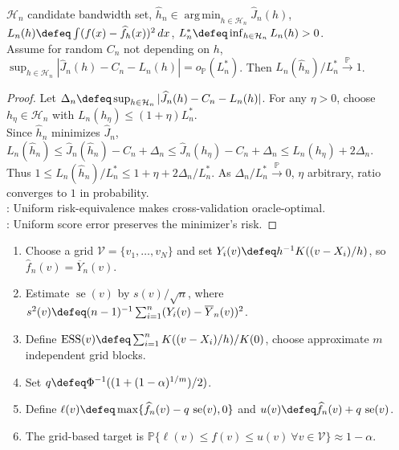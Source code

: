\begin{theorem} \label{thm:stone-cross-validation-oracle-risk} \\
$\mathcal{H}_n$ candidate bandwidth set, $\widehat h_n\in\operatorname*{arg\,min}_{h\in\mathcal{H}_n}\widehat J_n(h)$, $L_n(h)\defeq\int(f(x)-\widehat f_h(x))^2\,dx$, $L_n^*\defeq\inf_{h\in\mathcal{H}_n}L_n(h)>0$.\\
Assume for random $C_n$ not depending on $h$, $\sup_{h\in\mathcal{H}_n}|\widehat J_n(h)-C_n-L_n(h)|=o_{\mathbb{P}}(L_n^*)$. Then $L_n(\widehat h_n)/L_n^*\xrightarrow{\mathbb{P}}1$.
\begin{proof} Let $\Delta_n\defeq\sup_{h\in\mathcal{H}_n}|\widehat J_n(h)-C_n-L_n(h)|$. For any $\eta>0$, choose $h_\eta\in\mathcal{H}_n$ with $L_n(h_\eta)\leq(1+\eta)L_n^*$.\\
Since $\widehat h_n$ minimizes $\widehat J_n$, $L_n(\widehat h_n)\leq\widehat J_n(\widehat h_n)-C_n+\Delta_n\leq\widehat J_n(h_\eta)-C_n+\Delta_n\leq L_n(h_\eta)+2\Delta_n$.\\
Thus $1\leq L_n(\widehat h_n)/L_n^*\leq1+\eta+2\Delta_n/L_n^*$. As $\Delta_n/L_n^*\xrightarrow{\mathbb{P}}0$, $\eta$ arbitrary, ratio converges to $1$ in probability.\\
: Uniform risk-equivalence makes cross-validation oracle-optimal.\\
: Uniform score error preserves the minimizer's risk.
\end{proof}
\end{theorem}

\begin{method} \label{meth:kde-confidence-band-grid} 
\begin{enumerate}[label=(\roman*)]
\setlength{\itemsep}{0pt}
\item Choose a grid $\mathcal{V}=\{v_1,\ldots,v_N\}$ and set $Y_i(v)\defeq h^{-1}K((v-X_i)/h)$, so $\widehat f_n(v)=\overline Y_n(v)$.
\item Estimate $\operatorname{se}(v)$ by $s(v)/\sqrt n$, where $s^2(v)\defeq(n-1)^{-1}\sum_{i=1}^{n}(Y_i(v)-\overline Y_n(v))^2$.
\item Define $\operatorname{ESS}(v)\defeq\sum_{i=1}^{n}K((v-X_i)/h)/K(0)$, choose approximate $m$ independent grid blocks.
\item Set $q\defeq\Phi^{-1}((1+(1-\alpha)^{1/m})/2)$.
\item Define $\ell(v)\defeq\max\{\widehat f_n(v)-q\,\operatorname{se}(v),0\}$ and $u(v)\defeq\widehat f_n(v)+q\,\operatorname{se}(v)$.
\item The grid-based target is $\mathbb{P}\{\ell(v)\leq f(v)\leq u(v)\ \forall v\in\mathcal{V}\}\approx1-\alpha$.
\end{enumerate}
\end{method}

